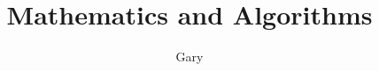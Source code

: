 \documentclass[a4paper, twocolumn]{article}
\title{Mathematics and Algorithms}
\author{Gary}
\begin{document}
\maketitle	

\begin{abstract}
	\lipsum[1]
\end{abstract}

\tableofcontents
\end{document}
